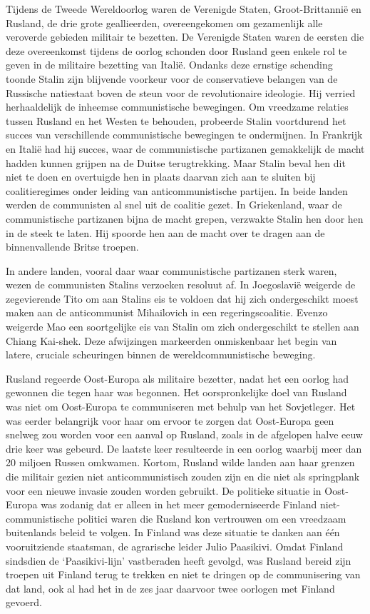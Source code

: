 \documentclass[
  a5paper,
  smalldemyvopaper,10pt,twoside,onecolumn,openright,extrafontsizes,hidelinks]{memoir}
\begin{document}
Tijdens de Tweede Wereldoorlog waren de Verenigde Staten,
Groot-Brittannië en Rusland, de drie grote geallieerden, overeengekomen
om gezamenlijk alle veroverde gebieden militair te bezetten. De
Verenigde Staten waren de eersten die deze overeenkomst tijdens de
oorlog schonden door Rusland geen enkele rol te geven in de militaire
bezetting van Italië. Ondanks deze ernstige schending toonde Stalin zijn
blijvende voorkeur voor de conservatieve belangen van de Russische
natiestaat boven de steun voor de revolutionaire ideologie. Hij verried
herhaaldelijk de inheemse communistische bewegingen. Om vreedzame
relaties tussen Rusland en het Westen te behouden, probeerde Stalin
voortdurend het succes van verschillende communistische bewegingen te
ondermijnen. In Frankrijk en Italië had hij succes, waar de
communistische partizanen gemakkelijk de macht hadden kunnen grijpen na
de Duitse terugtrekking. Maar Stalin beval hen dit niet te doen en
overtuigde hen in plaats daarvan zich aan te sluiten bij coalitieregimes
onder leiding van anticommunistische partijen. In beide landen werden de
communisten al snel uit de coalitie gezet. In Griekenland, waar de
communistische partizanen bijna de macht grepen, verzwakte Stalin hen
door hen in de steek te laten. Hij spoorde hen aan de macht over te
dragen aan de binnenvallende Britse troepen.

In andere landen, vooral daar waar communistische partizanen sterk
waren, wezen de communisten Stalins verzoeken resoluut af. In
Joegoslavië weigerde de zegevierende Tito om aan Stalins eis te voldoen
dat hij zich ondergeschikt moest maken aan de anticommunist Mihailovich
in een regeringscoalitie. Evenzo weigerde Mao een soortgelijke eis van
Stalin om zich ondergeschikt te stellen aan Chiang Kai-shek. Deze
afwijzingen markeerden onmiskenbaar het begin van latere, cruciale
scheuringen binnen de wereldcommunistische beweging.

Rusland regeerde Oost-Europa als militaire bezetter, nadat het een
oorlog had gewonnen die tegen haar was begonnen. Het oorspronkelijke
doel van Rusland was niet om Oost-Europa te communiseren met behulp van
het Sovjetleger. Het was eerder belangrijk voor haar om ervoor te zorgen
dat Oost-Europa geen snelweg zou worden voor een aanval op Rusland,
zoals in de afgelopen halve eeuw drie keer was gebeurd. De laatste keer
resulteerde in een oorlog waarbij meer dan 20 miljoen Russen omkwamen.
Kortom, Rusland wilde landen aan haar grenzen die militair gezien niet
anticommunistisch zouden zijn en die niet als springplank voor een
nieuwe invasie zouden worden gebruikt. De politieke situatie in
Oost-Europa was zodanig dat er alleen in het meer gemoderniseerde
Finland niet-communistische politici waren die Rusland kon vertrouwen om
een vreedzaam buitenlands beleid te volgen. In Finland was deze situatie
te danken aan één vooruitziende staatsman, de agrarische leider Julio
Paasikivi. Omdat Finland sindsdien de `Paasikivi-lijn' vastberaden heeft
gevolgd, was Rusland bereid zijn troepen uit Finland terug te trekken en
niet te dringen op de communisering van dat land, ook al had het in de
zes jaar daarvoor twee oorlogen met Finland gevoerd.
\end{document}
